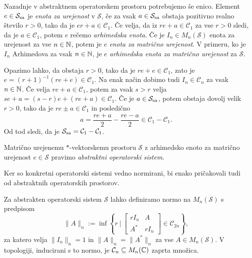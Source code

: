 Nazadnje v abstraktnem operatorskem prostoru potrebujemo še enico.
Element $e \in \mathcal{S}_{\operatorname{sa}}$ je \emph{enota za urejenost} v $\mathcal{S}$, 
če za vsak $a \in \mathcal{S}_{\operatorname{sa}}$ obstaja pozitivno realno število $r > 0$, tako da je 
$er + a \in \mathcal{C}_1$. Če velja, da iz $re + a \in \mathcal{C}_1$ za vse $r > 0$
sledi, da je $a \in \mathcal{C}_1$, potem $e$ rečemo \emph{arhimedska enota}.
Če je $I_n \in M_n (\mathcal{S})$ enota za urejenost za vse $n \in \mathbb N$, potem je $e$ \emph{enota za matrično urejenost}.
V primeru, ko je $I_n $ Arhimedova za vsak $n \in \mathbb N$, je $e$ \emph{arhimedska enota za matrično urejenost} za $\mathcal{S}$.

Opazimo lahko, da obstaja $r > 0$, tako da je $re + e \in \mathcal{C}_1$,
zato je $e = (r + 1)^{-1} (re + e) \in \mathcal{C}_1$. Na enak način dobimo tudi $I_n  \in \mathcal{C}_n$
za vsak $n \in \mathbb N$. Če velja $re + a \in \mathcal{C}_1$, potem za vsak $s > r$ velja 
$se + a = (s - r)e + (re + a) \in \mathcal{C}_1 $. Če je $a \in \mathcal{S}_{\operatorname{sa}}$, potem obstaja dovolj velik $r > 0$,
tako da je $re \pm a \in \mathcal{C}_1$ in posledično 
$$a = \frac{re + a}{2} - \frac{re - a}{2} \in \mathcal{C}_1 - \mathcal{C}_1.$$
Od tod sledi, da je $\mathcal{S}_{\operatorname{sa}} = \mathcal{C}_1 - \mathcal{C}_1$.

\begin{definicija}
    Matrično urejenemu $*$-vektorskemu prostoru $\mathcal{S}$ z arhimedsko 
    enoto za matrično urejenost $e \in \mathcal{S}$ pravimo \emph{abstraktni operatorski sistem}.
\end{definicija}

Ker so konkretni operatorski sistemi vedno normirani, bi enako pričakovali tudi od abstraktnih operatorskih prostorov.

\begin{trditev}
    Za abstrakten operatorski sistem $\mathcal{S}$ lahko definiramo normo na $M_n (\mathcal{S})$ s predpisom
    $$\| A\|_n := \inf \left\lbrace r\ |\ \begin{bmatrix}
        r I_n & A\\
        A^* & rI_n
    \end{bmatrix} \in \mathcal{C}_{2n} \right\rbrace,$$
    za katero velja $\| I_n\|_n = 1$ in $\| A\|_n = \| A^*\|_n$ za vse $A \in M_n(\mathcal{S})$.
    V topologiji, inducirani s to normo, je $\mathcal{C}_n \subseteq M_n (\mathbb C)$ zaprta množica.
\end{trditev}


